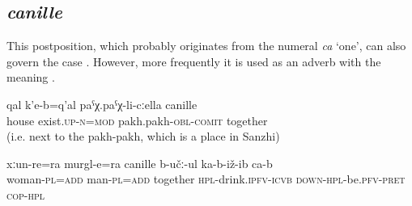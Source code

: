 \subsection{\textit{canille} }
\label{ssec:postposition canille}

This postposition, which probably originates from the numeral \textit{ca} `one', can also govern the  case . However, more frequently it is used as an adverb with the meaning  .
%
\begin{exe}
	\ex	\label{ex:There is a house together with the pakh-pakh}
	\gll	qal	k'e-b=q'al	paˁχ.paˁχ-li-cːella	canille  \\
		house	exist.\textsc{up}-\textsc{n}=\textsc{mod}	pakh.pakh-\textsc{obl}-\textsc{comit}	together\\
	\glt	{} (i.e. next to the pakh-pakh, which is a place in Sanzhi)

	\ex	\label{ex:Men and women are sitting together and drinking}
	\gll	xːun-re=ra	murgl-e=ra	canille	b-učː-ul	ka-b-iž-ib	ca-b  \\
		woman-\textsc{pl}=\textsc{add}	man-\textsc{pl}=\textsc{add}	together	\textsc{hpl}-drink.\textsc{ipfv}-\textsc{icvb}	\textsc{down-hpl}-be.\textsc{pfv}-\textsc{pret}	\textsc{cop-hpl}\\
	\glt	{}
\end{exe}



\subsection{ }
\label{ssec:postposition bahanne}

